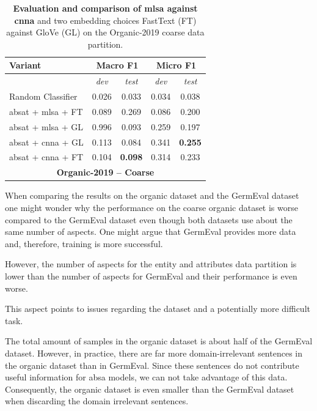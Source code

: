 \begin{table}[htb]
    \centering
    \begin{tabular*}{\textwidth}{l@{\extracolsep{\fill}}cccc@{}}
    \toprule
    Variant          & \multicolumn{2}{c}{\textbf{Macro F1}}     & \multicolumn{2}{c}{\textbf{Micro F1}}       \\ 
    \midrule
                     & \textit{dev}          & \textit{test}         & \textit{dev}              & \textit{test}         \\
    \midrule

    Random Classifier                  &  0.026         & 0.033&  0.034 &   0.038                  \\
    \gls{absat} + \gls{mlsa} + FT    & 0.089     & 0.269    &  0.086 &   0.200               \\ 
    \gls{absat} + \gls{mlsa} + GL    & 0.996     & 0.093    &  0.259 &   0.197               \\ 

    \gls{absat} + \gls{cnna} + GL   & 0.113     & 0.084    & 0.341   &  \textbf{0.255}                 \\     
    \gls{absat} + \gls{cnna} + FT   & 0.104     & \textbf{0.098} & 0.314  &   0.233                \\ 
    \bottomrule
    \multicolumn{5}{c}{\textbf{Organic-2019 -- Coarse}} \\
    \end{tabular*}
    \caption{\textbf{Evaluation and comparison of \acrfull{mlsa} against \acrfull{cnna}} and two embedding choices FastText {(FT)} against GloVe {(GL)} on the Organic-2019 coarse data partition.}
    \label{tab:06_resultsOrganic2}
\end{table}

When comparing the results on the organic dataset and the GermEval dataset one might wonder why the performance on the coarse organic dataset is worse compared to the GermEval dataset even though both datasets use about the same number of aspects. One might argue that GermEval provides more data and, therefore, training is more successful.

However, the number of aspects for the entity and attributes data partition is lower than the number of aspects for GermEval and their performance is even worse.

This aspect points to issues regarding the dataset and a potentially more difficult task. 
\medskip

The total amount of samples in the organic dataset is about half of the GermEval dataset. However, in practice, there are far more domain-irrelevant sentences in the organic dataset than in GermEval. Since these sentences do not contribute useful information for \gls{absa} models, we can not take advantage of this data. Consequently, the organic dataset is even smaller than the GermEval dataset when discarding the domain irrelevant sentences.
\medskip

